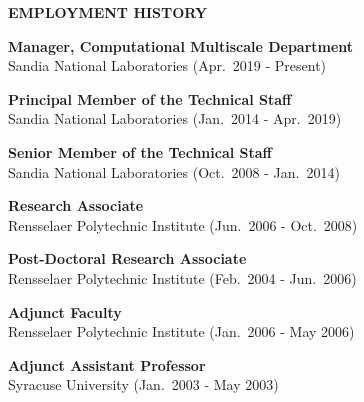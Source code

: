 
\vspace{\sectionskip}
\noindent
{\large \textbf{EMPLOYMENT HISTORY}}
\vspace{\sectionskip}

\begin{minipage}{\minipagewidth}
\textbf{Manager, Computational Multiscale Department}\\Sandia National Laboratories (Apr.~2019 - Present)
\end{minipage}\vspace{\parskip}

\begin{minipage}{\minipagewidth}
\textbf{Principal Member of the Technical Staff}\\Sandia National Laboratories (Jan.~2014 - Apr.~2019)
\end{minipage}\vspace{\parskip}

\begin{minipage}{\minipagewidth}
\textbf{Senior Member of the Technical Staff}\\Sandia National Laboratories (Oct.~2008 - Jan.~2014)
\end{minipage}\vspace{\parskip}

\begin{minipage}{\minipagewidth}
\textbf{Research Associate}\\Rensselaer Polytechnic Institute (Jun.~2006 - Oct.~2008)
\end{minipage}\vspace{\parskip}

\begin{minipage}{\minipagewidth}
\textbf{Post-Doctoral Research Associate}\\Rensselaer Polytechnic Institute (Feb.~2004 - Jun.~2006)
\end{minipage}\vspace{\parskip}

\begin{minipage}{\minipagewidth}
\textbf{Adjunct Faculty}\\Rensselaer Polytechnic Institute (Jan.~2006 - May 2006)
\end{minipage}\vspace{\parskip}

\begin{minipage}{\minipagewidth}
\textbf{Adjunct Assistant Professor}\\Syracuse University (Jan.~2003 - May 2003)
\end{minipage}\vspace{\parskip}

